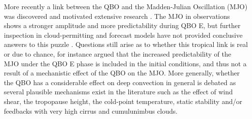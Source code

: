  More recently a link between the QBO and the Madden-Julian Oscillation (MJO) was discovered \citep{son2017} and motivated extensive research \citep[see e.g.][]{lee2018,wang2019,martin2020jgr}.
 The MJO in observations shows a stronger amplitude and more predictability during QBO E, but further inspection in cloud-permitting and forecast models have not provided conclusive answers to this puzzle \citep{martin2019,martin2020jgr}. Questions still arise as to whether this tropical link is real or due to chance, for instance \cite{wang2019} argued that the increased predictability of the MJO under the QBO E phase is included in the initial conditions, and thus not a result of a mechanistic effect of the QBO on the MJO. More generally, whether the QBO has a considerable effect on deep convection in general is debated as several plausible mechanisms exist in the literature \citep[see e.g.][]{nie2015} such as the effect of wind shear, the tropopause height, the cold-point temperature, static stability and/or feedbacks with very high cirrus and cumulunimbus clouds. 

